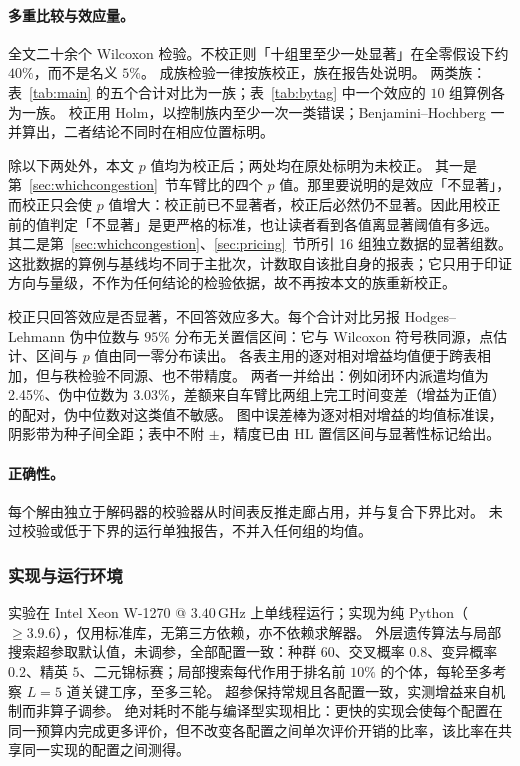 \documentclass[manuscript,screen,review]{acmart}
\newcommand{\NCases}{10}
\newcommand{\GainProbeLoop}{2.45\%}      %
\newcommand{\HLProbeLoop}{3.03\%}
\newcommand{\MatrixCells}{16}
\begin{document}
\paragraph{多重比较与效应量。}
全文二十余个 Wilcoxon 检验。不校正则「十组里至少一处显著」在全零假设下约 $40\%$，而不是名义 $5\%$。
成族检验一律按族校正，族在报告处说明。
两类族：表~\ref{tab:main} 的五个合计对比为一族；表~\ref{tab:bytag} 中一个效应的 $\NCases$ 组算例各为一族。
校正用 Holm，以控制族内至少一次一类错误；Benjamini--Hochberg 一并算出，二者结论不同时在相应位置标明。

除以下两处外，本文 $p$ 值均为校正后；两处均在原处标明为未校正。
其一是第~\ref{sec:whichcongestion}~节车臂比的四个 $p$ 值。那里要说明的是效应「不显著」，而校正只会使 $p$ 值增大：校正前已不显著者，校正后必然仍不显著。因此用校正前的值判定「不显著」是更严格的标准，也让读者看到各值离显著阈值有多远。
其二是第~\ref{sec:whichcongestion}、\ref{sec:pricing}~节所引 \MatrixCells{} 组独立数据的显著组数。这批数据的算例与基线均不同于主批次，计数取自该批自身的报表；它只用于印证方向与量级，不作为任何结论的检验依据，故不再按本文的族重新校正。

校正只回答效应是否显著，不回答效应多大。每个合计对比另报 Hodges--Lehmann 伪中位数与 $95\%$ 分布无关置信区间：它与 Wilcoxon 符号秩同源，点估计、区间与 $p$ 值由同一零分布读出。
各表主用的逐对相对增益均值便于跨表相加，但与秩检验不同源、也不带精度。
两者一并给出：例如闭环内派遣均值为 \GainProbeLoop{}、伪中位数为 \HLProbeLoop{}，差额来自车臂比两组上完工时间变差（增益为正值）的配对，伪中位数对这类值不敏感。
图中误差棒为逐对相对增益的均值标准误，阴影带为种子间全距；表中不附 $\pm$，精度已由 HL 置信区间与显著性标记给出。

\paragraph{正确性。}
每个解由独立于解码器的校验器从时间表反推走廊占用，并与复合下界比对。
未过校验或低于下界的运行单独报告，不并入任何组的均值。

\subsubsection{实现与运行环境}
\label{sec:impl}
实验在 Intel Xeon W-1270 @ $3.40$\,GHz 上单线程运行；实现为纯 Python（$\ge 3.9.6$），仅用标准库，无第三方依赖，亦不依赖求解器。
外层遗传算法与局部搜索超参取默认值，未调参，全部配置一致：种群 $60$、交叉概率 $0.8$、变异概率 $0.2$、精英 $5$、二元锦标赛；局部搜索每代作用于排名前 $10\%$ 的个体，每轮至多考察 $L=5$ 道关键工序，至多三轮。
超参保持常规且各配置一致，实测增益来自机制而非算子调参。
绝对耗时不能与编译型实现相比：更快的实现会使每个配置在同一预算内完成更多评价，但不改变各配置之间单次评价开销的比率，该比率在共享同一实现的配置之间测得。
\end{document}
